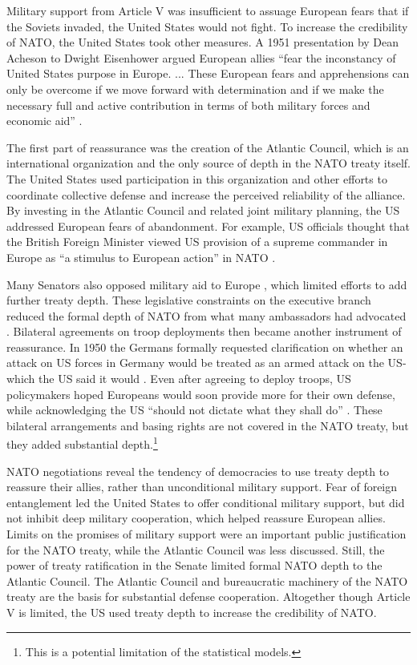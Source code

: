 \documentclass[12pt]{article}
\begin{document}
Military support from Article V was insufficient to assuage European fears that if the Soviets invaded, the United States would not fight. 
To increase the credibility of NATO, the United States took other measures.  
A 1951 presentation by Dean Acheson to Dwight Eisenhower argued European allies ``fear the inconstancy of United States purpose in Europe. ... These European fears and apprehensions can only be overcome if we move forward with determination and if we make the necessary full and active contribution in terms of both military forces and economic aid'' \citep[pg. 3]{Acheson1951}. 


The first part of reassurance was the creation of the Atlantic Council, which is an international organization and the only source of depth in the NATO treaty itself. 
The United States used participation in this organization and other efforts to coordinate collective defense and increase the perceived reliability of the alliance. 
By investing in the Atlantic Council and related joint military planning, the US addressed European fears of abandonment. 
For example, US officials thought that the British Foreign Minister viewed US provision of a supreme commander in Europe as ``a stimulus to European action'' in NATO \citep{Acheson1950}. 


Many Senators also opposed military aid to Europe \citep[pg 285]{Acheson1969}, which limited efforts to add further treaty depth. 
These legislative constraints on the executive branch reduced the formal depth of NATO from what many ambassadors had advocated \citep[pg 277]{Acheson1969}. 
Bilateral agreements on troop deployments then became another instrument of reassurance. 
In 1950 the Germans formally requested clarification on whether an attack on US forces in Germany would be treated as an armed attack on the US- which the US said it would \citep[pg. 395]{Acheson1969}.  
Even after agreeing to deploy troops, US policymakers hoped Europeans would soon provide more for their own defense, while acknowledging the US ``should not dictate what they shall do'' \citep[pg. 2]{Johnson1950}. 
These bilateral arrangements and basing rights are not covered in the NATO treaty, but they added substantial depth.\footnote{This is a potential limitation of the statistical models.}  


NATO negotiations reveal the tendency of democracies to use treaty depth to reassure their allies, rather than unconditional military support. 
Fear of foreign entanglement led the United States to offer conditional military support, but did not inhibit deep military cooperation, which helped reassure European allies. 
Limits on the promises of military support were an important public justification for the NATO treaty, while the Atlantic Council was less discussed. 
Still, the power of treaty ratification in the Senate limited formal NATO depth to the Atlantic Council. 
The Atlantic Council and bureaucratic machinery of the NATO treaty are the basis for substantial defense cooperation. 
Altogether though Article V is limited, the US used treaty depth to increase the credibility of NATO. 
\end{document}
